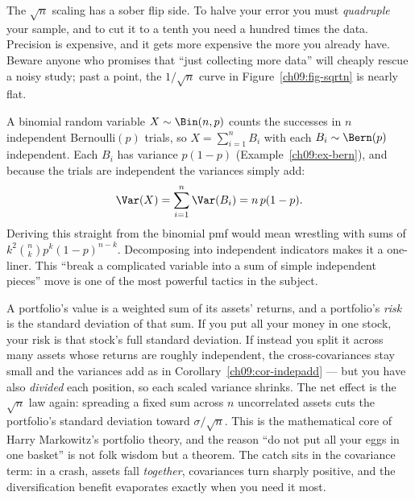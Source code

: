 \begin{trapbox}
The $\sqrt{n}$ scaling has a sober flip side. To halve your error you must
\emph{quadruple} your sample, and to cut it to a tenth you need a hundred times
the data. Precision is expensive, and it gets more expensive the more you
already have. Beware anyone who promises that ``just collecting more data''
will cheaply rescue a noisy study; past a point, the $1/\sqrt n$ curve in
Figure~\ref{ch09:fig-sqrtn} is nearly flat.
\end{trapbox}

\begin{example}
\label{ch09:ex-binom}
A binomial random variable $X \sim \Bin(n,p)$ counts the successes in $n$
independent Bernoulli$(p)$ trials, so $X = \sum_{i=1}^n B_i$ with each
$B_i \sim \Bern(p)$ independent. Each $B_i$ has variance $p(1-p)$
(Example~\ref{ch09:ex-bern}), and because the trials are independent the
variances simply add:
\[
  \Var(X) = \sum_{i=1}^n \Var(B_i) = n\,p(1-p).
\]
Deriving this straight from the binomial pmf would mean wrestling with sums of
$k^2\binom{n}{k}p^k(1-p)^{n-k}$. Decomposing into independent indicators makes
it a one-liner. This ``break a complicated variable into a sum of simple
independent pieces'' move is one of the most powerful tactics in the subject.
\end{example}

\begin{applicationbox}
A portfolio's value is a weighted sum of its assets' returns, and a
portfolio's \emph{risk} is the standard deviation of that sum. If you put all
your money in one stock, your risk is that stock's full standard deviation. If
instead you split it across many assets whose returns are roughly
independent, the cross-covariances stay small and the variances add as in
Corollary~\ref{ch09:cor-indepadd} --- but you have also \emph{divided} each
position, so each scaled variance shrinks. The net effect is the $\sqrt n$
law again: spreading a fixed sum across $n$ uncorrelated assets cuts the
portfolio's standard deviation toward $\sigma/\sqrt n$. This is the
mathematical core of Harry Markowitz's portfolio theory, and the reason ``do
not put all your eggs in one basket'' is not folk wisdom but a theorem. The
catch sits in the covariance term: in a crash, assets fall \emph{together},
covariances turn sharply positive, and the diversification benefit
evaporates exactly when you need it most.
\end{applicationbox}

